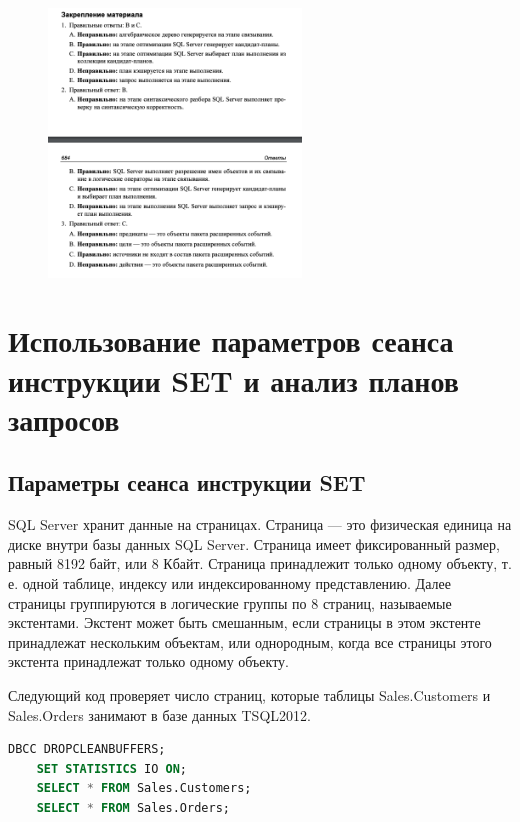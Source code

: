 \begin{figure}[h!]
	\begin{center}
		\includegraphics[width=0.6\textwidth]{img/ans40.png}
	\end{center}
	\captionsetup{justification=centering}
\end{figure}
\clearpage



\section{Использование параметров сеанса инструкции SET и анализ планов запросов}

\subsection{Параметры сеанса инструкции SET}

SQL Server хранит данные на страницах. Страница — это физическая единица на диске внутри базы данных SQL Server. Страница имеет фиксированный размер, равный 8192 байт, или 8 Кбайт. Страница принадлежит
только одному объекту, т. е. одной таблице, индексу или индексированному представлению. Далее страницы группируются в логические группы по 8 страниц, называемые экстентами. Экстент может быть смешанным, если страницы в этом
экстенте принадлежат нескольким объектам, или однородным, когда все страницы
этого экстента принадлежат только одному объекту. 



Следующий код проверяет число страниц, которые таблицы Sales.Customers и
Sales.Orders занимают в базе данных TSQL2012. 

\begin{lstlisting}[label=lst:funcReturn, language=sql]
	DBCC DROPCLEANBUFFERS;
	SET STATISTICS IO ON;
	SELECT * FROM Sales.Customers;
	SELECT * FROM Sales.Orders;
\end{lstlisting}

